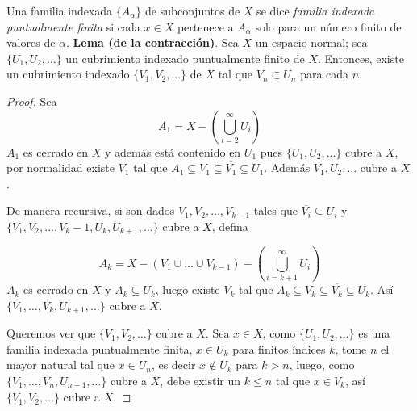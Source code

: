 
\item Una familia indexada \( \{ A_{\alpha} \} \) de subconjuntos de \( X \) se dice \textit{familia indexada puntualmente finita} si cada \( x \in X \) pertenece a \( A_{\alpha} \) solo para un número finito de valores de \( \alpha \).  
    \textbf{Lema (de la contracción)}. Sea \( X \) un espacio normal; sea \( \{ U_1, U_2, \dots \} \) un cubrimiento indexado puntualmente finito de \( X \). Entonces, existe un cubrimiento indexado \( \{ V_1, V_2, \dots \} \) de \( X \) tal que \( \bar{V}_n \subset U_n \) para cada \( n \).

\begin{proof}
    Sea 
    \[
    A_1 = X - \left(\bigcup_{i=2}^{\infty} U_i \right) 
    \]
    $A_1$ es cerrado en $X$ y además está contenido en $U_1$ pues $\{U_1,U_2,\ldots\}$ cubre a $X$, por normalidad existe $V_1$ tal que $A_1 \subseteq V_1 \subseteq \overline{V_1} \subseteq U_1$. Además ${V_1,U_2,\ldots}$ cubre a $X$.

    De manera recursiva, si son dados $V_1,V_2, \ldots, V_{k-1}$ tales que $\overline{V_i}\subseteq U_i$ y $\{V_1,V_2,\ldots,V_k-1,U_k,U_{k+1},\ldots\}$ cubre a $X$, defina

    \[
    A_k = X- (V_1 \cup \ldots \cup V_{k-1}) - \left(\bigcup_{i=k+1}^{\infty} U_i \right)
    \]
    $A_k$ es cerrado en $X$ y $A_k \subseteq U_k$, luego existe $V_k$ tal que $A_k \subseteq V_k \subseteq \overline{V_k} \subseteq U_k$. Así $\{V_1,\ldots,V_k,U_{k+1},\ldots\}$ cubre a $X$.

    Queremos ver que $\{V_1,V_2,\ldots\}$ cubre a $X$. Sea $x \in X$, como $\{U_1, U_2, \ldots\}$ es una familia indexada puntualmente finita, $x \in U_k$ para finitos índices $k$, tome $n$ el mayor natural tal que $x \in U_n$, es decir $x \notin U_k$ para $k > n$, luego, como $\{V_1,\ldots,V_n,U_{n+1},\ldots\}$ cubre a $X$, debe existir un $k \leq n$ tal que $x \in V_k$, así $\{V_1,V_2,\ldots\}$ cubre a $X$.
\end{proof}